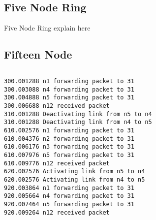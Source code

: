 \documentclass[11pt]{article}
\begin{document}
\subsection{Five Node Ring}

Five Node Ring explain here


\subsection{Fifteen Node}


 \begin{lstlisting} 

\end{lstlisting}

 \begin{lstlisting} 
300.001288 n1 forwarding packet to 31
300.003088 n4 forwarding packet to 31
300.004888 n5 forwarding packet to 31
300.006688 n12 received packet
310.001288 Deactivating link from n5 to n4
310.001288 Deactivating link from n4 to n5
610.002576 n1 forwarding packet to 31
610.004376 n2 forwarding packet to 31
610.006176 n3 forwarding packet to 31
610.007976 n5 forwarding packet to 31
610.009776 n12 received packet
620.002576 Activating link from n5 to n4
620.002576 Activating link from n4 to n5
920.003864 n1 forwarding packet to 31
920.005664 n4 forwarding packet to 31
920.007464 n5 forwarding packet to 31
920.009264 n12 received packet

\end{lstlisting}
\end{document}
